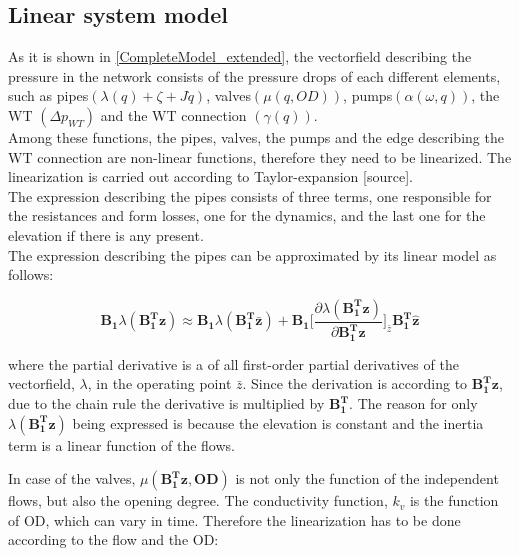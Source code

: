 %
%
%
%

\subsection{Linear system model}
 \label{SystemLin}
 
As it is shown in \eqref{CompleteModel_extended}, the vectorfield describing the pressure in the network consists of the pressure drops of each different elements, such as pipes$(\lambda(q) + \zeta + J \dot{q})$, valves$(\mu(q,OD))$, pumps$(\alpha(\omega, q))$, the WT $(\Delta p_{WT})$ and the WT connection $(\gamma(q))$.
\\
Among these functions, the pipes, valves, the pumps and the edge describing the WT connection are non-linear functions, therefore they need to be linearized. The linearization is carried out according to Taylor-expansion [source].
\\
The expression describing the pipes consists of three terms, one responsible for the resistances and form losses, one for the dynamics, and the last one for the elevation if there is any present. 
\\
The expression describing the pipes can be approximated by its linear model as follows:

\begin{equation}
  \pmb{B_1} \lambda(\pmb{{B_1^{T}}}\pmb{z}) \approx  \pmb{B_1} \lambda(\pmb{B_1^T \bar{ z}}) + \pmb{B_1} \bigg[ \frac{\partial{\lambda(\pmb{{B_1^{T}}}\pmb{z})}}{{\partial{\pmb{{B_1^{T}}}\pmb{z}}}}   \bigg]_{\bar{z}} \pmb{{B_1^{T}}}\pmb{\hat{z}}
\label{lambda_lin}
\end{equation}

where the partial derivative is a of all first-order partial derivatives of the vectorfield, $\lambda$, in the operating point $\bar{z}$. Since the derivation is according to $\pmb{{B_1^{T}}}\pmb{z}$, due to the chain rule the derivative is multiplied by $\pmb{{B_1^{T}}}$. The reason for only $\lambda(\pmb{{B_1^{T}}}\pmb{z})$ being expressed is because the elevation is constant and the inertia term is a linear function of the flows.


In case of the valves, $\mu(\pmb{{B_1^{T}}}\pmb{z}, \pmb{OD})$ is not only the function of the independent flows, but also the opening degree. The conductivity function, $k_v$ is the function of OD, which can vary in time. Therefore the linearization has to be done according to the flow and the OD: 

